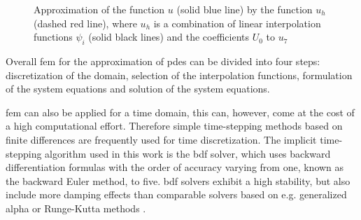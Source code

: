 \begin{figure}
\centering
{}
\caption[Approximation of a function with FEM]{Approximation of the function $u$ (solid blue line) by the function $u_{h}$ (dashed red line), where $u_{h}$ is a combination of linear interpolation functions $\psi_{i}$ (solid black lines) and the coefficients $U_{0}$ to $u_{7}$ \cite{ComsolFEM}
\label{fig:FEM}
}
\end{figure}

Overall \gls{fem} for the approximation of \glspl{pde} can be divided into four steps: discretization of the domain, selection of the interpolation functions, formulation of the system equations and solution of the system equations. 
 
\Gls{fem} can also be applied for a time domain, this can, however, come at the cost of a high computational effort. Therefore simple time-stepping methods based on finite differences are frequently used for time discretization. The implicit time-stepping algorithm used in this work is the \gls{bdf} solver, which uses backward differentiation formulas with the order of accuracy varying from one, known as the backward Euler method, to five. \gls{bdf} solvers exhibit a high stability, but also include more damping effects than comparable solvers based on e.g. generalized alpha or Runge-Kutta methods \cite{ComsolRefManual}.
\FloatBarrier
